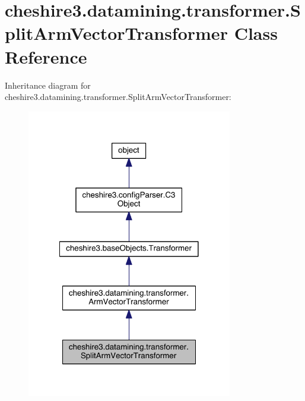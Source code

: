 \hypertarget{classcheshire3_1_1datamining_1_1transformer_1_1_split_arm_vector_transformer}{\section{cheshire3.\-datamining.\-transformer.\-Split\-Arm\-Vector\-Transformer Class Reference}
\label{classcheshire3_1_1datamining_1_1transformer_1_1_split_arm_vector_transformer}
}


Inheritance diagram for cheshire3.\-datamining.\-transformer.\-Split\-Arm\-Vector\-Transformer\-:
\nopagebreak
\begin{figure}[H]
\begin{center}
\leavevmode
\includegraphics[width=254pt]{classcheshire3_1_1datamining_1_1transformer_1_1_split_arm_vector_transformer__inherit__graph}
\end{center}
\end{figure}


